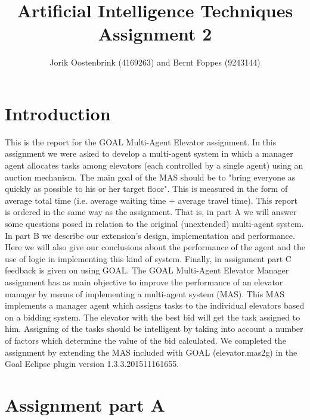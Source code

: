 \documentclass[a4paper,11pt]{article}
\title{Artificial Intelligence Techniques Assignment 2}
\author{Jorik Oostenbrink (4169263) and Bernt Foppes (9243144)}
\date{}
\begin{document}
\maketitle	

\section{Introduction}
This is the report for the GOAL Multi-Agent Elevator assignment. In this assignment we were asked to develop a multi-agent system in which a manager agent allocates tasks among elevators (each controlled by a single agent) using an auction mechanism.
\newline\newline
The main goal of the MAS should be to "bring everyone as quickly as possible to his or her target floor". This is measured in the form of average total time (i.e. average waiting time + average travel time).
\newline\newline
This report is ordered in the same way as the assignment. That is, in part A we will answer some questions posed in relation to the original (unextended) multi-agent system. In part B we describe our extension's design, implementation and performance. Here we will also give our conclusions about the performance of the agent and the use of logic in implementing this kind of system. Finally, in assignment part C feedback is given on using GOAL.
\newline\newline
The GOAL Multi-Agent Elevator Manager assignment has as main objective to improve the performance of an elevator manager by means of implementing a multi-agent system (MAS). This MAS implements a manager agent which assigns tasks to the individual elevators based on a bidding system. The elevator with the best bid will get the task assigned to him. Assigning of the tasks should be intelligent by taking into account a number of factors which determine the value of the bid calculated. 
\newline\newline
We completed the assignment by extending the MAS included with GOAL (elevator.mas2g) in the Goal Eclipse plugin version 1.3.3.201511161655.

\section{Assignment part A}
\end{document}
